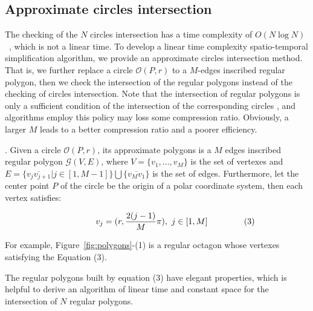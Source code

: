 \subsection{Approximate circles intersection}

The checking of the $N$ circles intersection has a time complexity of \textcolor[rgb]{1.00,0.00,0.00}{${O(N\log N)}$~\cite{Shamos:Circle}}, which is not a linear time.
To develop a linear time complexity spatio-temporal simplification algorithm, we provide an approximate circles intersection method.
That is, we further replace a circle $\mathcal{O}(P, r)$ to a $M$-edges inscribed regular polygon,
then we check the intersection of the regular polygons instead of the checking of circles intersection.
Note that the intersection of regular polygons is only a sufficient condition of the intersection of the corresponding circles , and
algorithms employ this policy may loss some compression ratio. Obviously, a larger $M$ leads to a better compression ratio and a poorer
efficiency.

.
Given a circle $\mathcal{O}(P, r)$, its approximate polygons is a $M$ edges inscribed regular polygon $\mathcal{G}(V, E)$,
where $V=\{v_1, \ldots, v_{M}\}$ is the set of vertexes and
$E= \{\overline{v_jv_{j+1}}| j\in [1,M-1]\} \bigcup \{\overline{v_Mv_1}\}$ is the set of edges.
Furthermore, let the center point $P$ of the circle be the origin of a polar coordinate system, then each vertex satisfies:

\vspace{-2ex}
\begin{equation*}
\label{equ-regular-polygon}
    \begin{aligned}
        \hspace{10ex}  v_j = (r, \frac{2(j-1)}{M}\pi), ~j \in [1, M]    \hspace{10ex} (3)\\
    \end{aligned}
\end{equation*}
\vspace{-2ex}


For example, Figure~\ref{fig:polygons}-(1) is a regular octagon whose vertexes satisfying the Equation (3).

The regular polygons built by equation (3) have elegant properties, which is helpful to derive an algorithm of linear time and constant space
for the intersection of $N$ regular polygons.


